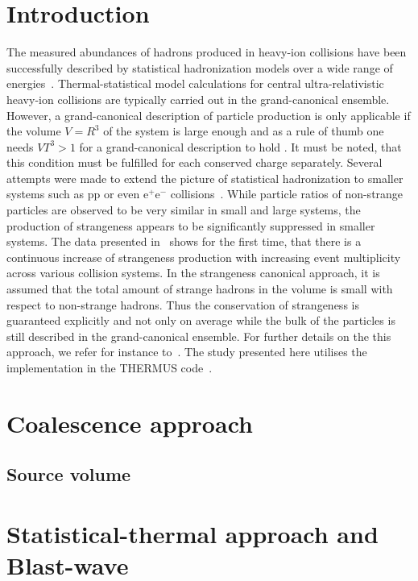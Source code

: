\documentclass[a4paper,11pt]{scrartcl} %
\begin{document}
\section{Introduction} 
The measured abundances of hadrons produced in heavy-ion collisions have been successfully described by statistical hadronization models over a wide range of energies~\cite{Andronic:2011yq,Cleymans:1998fq,Andronic:2005yp}. Thermal-statistical model calculations for central ultra-relativistic heavy-ion collisions are typically carried out in the grand-canonical ensemble. However, a grand-canonical description of particle production is only applicable if the volume $V=R^{3}$ of the system is large enough and as a rule of thumb one needs $VT^{3} > 1$ for a grand-canonical description to hold \cite{Hagedorn:1984uy,Rafelski:1980gk}. It must be noted, that this condition must be fulfilled for each conserved charge separately.
Several attempts were made to extend the picture of statistical hadronization to smaller systems such as pp or even e$^{+}$e$^{-}$ collisions~\cite{Redlich:2009xx,Becattini:1996gy,Kraus:2008fh}. While particle ratios of non-strange particles are observed to be very similar in small and large systems, the production of strangeness appears to be significantly suppressed in smaller systems. The data presented in~\cite{Adam:2016emw} shows for the first time, that there is a continuous increase of strangeness production with increasing event multiplicity across various collision systems. In the strangeness canonical approach, it is assumed that the total amount of strange hadrons in the volume is small with respect to non-strange hadrons. Thus the conservation of strangeness is guaranteed explicitly and not only on average while the bulk of the particles is still described in the grand-canonical ensemble. For further details on the this approach, we refer for instance to~\cite{BraunMunzinger:2003zd,BraunMunzinger:2001as,Hamieh:2000tk,Cleymans:2004bf,Kraus:2007hf}. The study presented here utilises the implementation in the THERMUS code~\cite{Wheaton:2004qb}. 

\section{Coalescence approach}

\subsection{Source volume}

\section{Statistical-thermal approach and Blast-wave}
\end{document}
